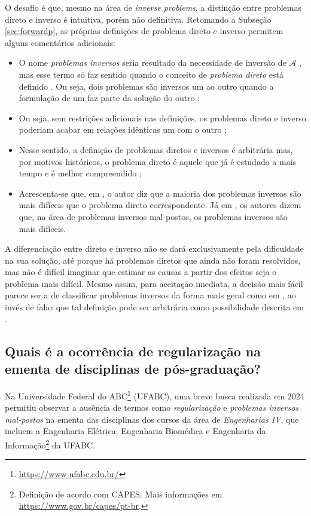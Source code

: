  O desafio é que, mesmo na área de  \textit{inverse problems}, a distinção entre problemas direto e inverso é intuitiva, porém não definitiva. Retomando a Subseção \ref{sec:forwardp}, as próprias definições de problema direto e inverso permitem alguns comentários adicionais:
\begin{itemize}
\item O nome \textit{problemas inversos} seria resultado da necessidade de inversão de $\mathcal{A}$ \cite[pág. 3]{Flemming2018}, mas esse termo só faz sentido quando o conceito de \textit{problema direto} está definido \cite[pág. 1]{kaipio2005statistical}. Ou seja, dois problemas são inversos um ao outro quando a formulação de um faz parte da solução do outro \cite{Keller1976};
\item Ou seja, sem restrições adicionais nas definições, os problemas direto e inverso poderiam acabar em relações idênticas um com o outro \cite[pág. 4]{Mueller2012}; 
\item Nesse sentido, a definição de problemas diretos e inversos é arbitrária mas, por motivos históricos, o problema direto é aquele que já é estudado a mais tempo e é melhor compreendido \cite{Keller1976};
\item Acrescenta-se que, em \cite[Subseção 2.1]{Bunge2019}, o autor diz que a maioria dos problemas inversos são mais difíceis que o problema direto correspondente. Já em \cite[pág. 4]{Mueller2012}, os autores dizem que, na área de problemas inversos mal-postos, os problemas inversos são mais difíceis. 
\end{itemize}
A diferenciação entre direto e inverso não se dará exclusivamente pela dificuldade na sua solução, até porque há problemas diretos que ainda não foram resolvidos, mas não é difícil imaginar que estimar as causas a partir dos efeitos seja o problema mais difícil. Mesmo assim, para aceitação imediata, a decisão mais fácil parece ser a de classificar problemas inversos da forma mais geral como em \cite{Bunge2019}, ao invés de falar que tal definição pode ser arbitrária como possibilidade descrita em \cite{Keller1976}.  

\subsection{Quais é a ocorrência de regularização na ementa de disciplinas de pós-graduação?}

Na Universidade Federal do ABC\footnote{\url{https://www.ufabc.edu.br/}} (UFABC), uma breve busca realizada em 2024 permitiu observar a ausência de termos como \textit{regularização} e \textit{problemas inversos mal-postos} na ementa das disciplinas dos cursos da área de \textit{Engenharias IV}, que incluem a Engenharia Elétrica, Engenharia Biomédica e Engenharia da Informação\footnote{Definição de acordo com CAPES. Mais informações em \url{https://www.gov.br/capes/pt-br}.} da UFABC. 

